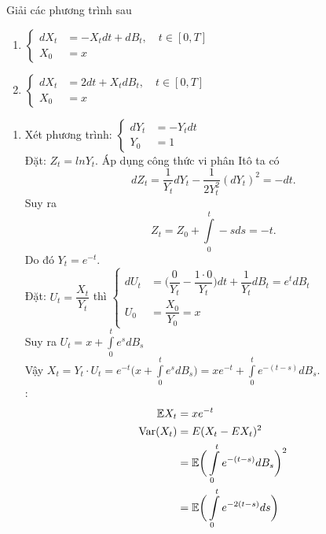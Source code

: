 \begin{exam*}
    Giải các phương trình sau
    \begin{enumerate}
        \item 
        $\begin{cases}
            dX_t &= -X_tdt + dB_t, \quad t\in [0,T] \\
            X_0 &=  x
         \end{cases}$
        \item 
        $\begin{cases}
            dX_t &= 2dt + X_tdB_t, \quad t\in [0,T] \\
            X_0 &=  x
        \end{cases}$
    \end{enumerate}
\end{exam*}
\begin{sol*}
\begin{enumerate}
    \item Xét phương trình: 
    $\begin{cases}
            dY_t &= -Y_tdt \\
            Y_0 &=  1
    \end{cases}$\\
    Đặt: $Z_t = lnY_t$. Áp dụng công thức vi phân Itô ta có
    \[dZ_t = \dfrac{1}{Y_t}dY_t -\dfrac{1}{2Y_t^2}(dY_t)^2 = -dt.\] Suy ra \[Z_t = Z_0 + \displaystyle\int\limits_0^t-sds = -t.\] Do đó $Y_t = e^{-t}.$\\
    Đặt: $U_t = \dfrac{X_t}{Y_t}$ thì $\begin{cases}
            dU_t &= \Big(\dfrac{0}{Y_t} - \dfrac{1\cdot 0}{Y_t}\Big)dt + \dfrac{1}{Y_t}dB_t = e^tdB_t \\
            U_0 &=  \dfrac{X_0}{Y_0} = x
    \end{cases}$\\
    Suy ra $U_t = x + \displaystyle\int\limits_0^te^sdB_s$\\
    Vậy $X_t = Y_t \cdot U_t = e^{-t}\bigg(x+\displaystyle\int\limits_0^te^sdB_s\bigg) = xe^{-t} + \displaystyle\int\limits_0^t e^{-(t-s)}dB_s.$\\
    \remarkname: \begin{align*}
        \E X_t &= xe^{-t}\\
        \Var(X_t) &= E(X_t - EX_t)^2\\
        &= \E\bigg(\displaystyle\int\limits_0^t e^{-(t-s)}dB_s\bigg)^2\\
        &= \E\bigg(\displaystyle\int\limits_0^t e^{-2(t-s)}ds\bigg)\\

\end{align*}
\end{enumerate}
\end{sol*}
